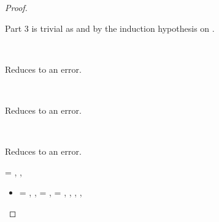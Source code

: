 \begin{lemma}
\begin{proof}
\begin{case}[B-IfTrue]
\begin{itemize}
\begin{subcase}[T-If]
              Part 3 is trivial as
              \opsem {\openv{}} {} {\val{}}
              and {\judgementtwo{}{\val{}}{\ty{}}} by the induction hypothesis on {}.

      \end{subcase}
  \end{itemize}
\end{case}

\begin{case}[BE-If]
  \ 

  Reduces to an error.
\end{case}

\begin{case}[BE-IfFalse]
  \ 

  Reduces to an error.
\end{case}

\begin{case}[BE-IfTrue]
  \ 

  Reduces to an error.
\end{case}

\begin{case}[B-Let]
  \e{} = { {} {}},
        \opsem {\openv{}} {} {},
         {} {\val{}}


  \begin{itemize}
    \item[]
      \begin{subcase}[T-Let]
  \ep{} = { {} {}},
  \judgementrewrite {\propenv{}} {} {\s{}} { {}}
             {}
             {},
             \propp{} = {\impprop {\notprop {\falsy{}} {\x{}}} {}},
             \proppp{} = {\impprop {\isprop {\falsy{}} {\x{}}} {}},
  \judgementrewrite
       {\propenv{}, {\isprop {\s{}} {\x{}}},
         {\propp{}},
         {\proppp{}}}
             {} {\ty{}} {\filterset {\thenprop {\prop{}}} {\elseprop {\prop{}}}}
             {\object{}} 
             {}


\end{subcase}
\end{itemize}
\end{case}
\end{proof}
\end{lemma}
